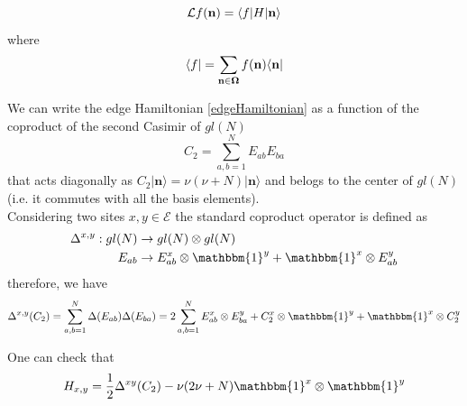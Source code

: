 \documentclass[11pt]{article}
\numberwithin{equation}{section}
\numberwithin{equation}{subsection}
\newcommand{\twoj}{\nu}
\begin{document}
\begin{equation}
    \mathcal{L}f( {\bf n})=\langle f|H| {\bf n}\rangle
\end{equation}
where 
\begin{equation}
    \langle f|=\sum_{ {\bf n\in \Omega}}f( {\bf n})\langle  {\bf n}|
\end{equation}

We can write the edge Hamiltonian \eqref{edgeHamiltonian} as a function of the coproduct of the second Casimir of $gl(N)$
\begin{equation}\label{secondCasimir}
    C_{2}=\sum_{a,b=1}^{N}E_{ab}E_{ba}
\end{equation}
that acts diagonally as $C_{2}|\mathbf{n}\rangle=\twoj(\twoj+N)|\mathbf{n}\rangle$ and belogs to the center of $gl(N)$ (i.e. it commutes with all the basis elements).  \\
 Considering two sites $x,y\in \mathcal{E}$ the standard coproduct operator is defined as 
\begin{equation}
\begin{split}
\Delta^{x,y}:gl(N)&\to gl(N)\otimes gl(N)\\
E_{ab}&\to E_{ab}^{x}\otimes \mathbbm{1}^{y}+\mathbbm{1}^{x}\otimes E_{ab}^{y}
\end{split}
\end{equation}
therefore, we have 
\begin{equation}
\Delta^{x,y}(C_{2})=\sum_{a,b=1}^{N}\Delta(E_{ab})\Delta(E_{ba})=2\sum_{a,b=1}^{N}E_{ab}^{x}\otimes E_{ba}^{y}+C_{2}^{x}\otimes \mathbbm{1}^{y}+\mathbbm{1}^{x}\otimes C_{2}^{y}
\end{equation}

One can check that 
\begin{equation}\label{hamiltonianCasimir}
	H_{x,y}=\frac{1}{2}\Delta^{xy}(C_{2})-\twoj(2\twoj+N)\mathbbm{1}^{x}\otimes\mathbbm{1}^{y}
\end{equation}
 
\end{document}
